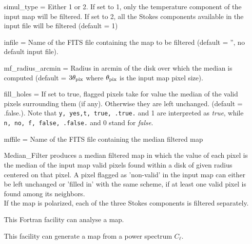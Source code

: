 \begin{qualifiers}
  \begin{qulistwide}{} %
%
    \item[{simul\_type = }]%
 Either 1 or 2. If set to 1, only the temperature component of the
      input map will be filtered. If set to 2, all the Stokes components available
      in the input file will be filtered (default = 1)
%
    \item[{infile = }]%
 Name of the FITS file containing the map to be filtered
      (default = '', no default input file).
%
    \item[{mf\_radius\_arcmin = }]%
 Radius in arcmin of the disk over which the
      median is computed (default = $3\theta_{\rm pix}$ where $\theta_{\rm pix}$
      is the input map pixel size).
%
    \item[{fill\_holes = }]%
 If set to true, flagged pixels take for value the median of
      the valid pixels surrounding them (if any). Otherwise they are left
      unchanged.
      (default = .false.). Note that {\tt y, yes,t, true, .true.} and 1 are
      interpreted as {\em true}, while {\tt n, no, f, false, .false.} and 0 stand
      for {\em false}.
%
    \item[{mffile = }]%
 Name of the FITS file containing the median filtered map
%
  \end{qulistwide}
\end{qualifiers}

\begin{codedescription}
{%
Median\_Filter produces a median filtered map in which the value of each pixel
is the median of the input map valid pixels found within a disk of given
  radius centered on that pixel. A pixel flagged as 'non-valid' in the input map
  can either be left unchanged or 'filled in' with the same scheme, if at
  least one valid pixel is found among its neighbors. \\
If the map is polarized, each of the three Stokes components is filtered separately.
}
\end{codedescription}

\begin{support}
  \begin{sulist}{} %
  \item[\htmlref{anafast}{fac:anafast}] This \healpix Fortran facility can
     	       analyse a \healpix map.
  \item[\htmlref{synfast}{fac:synfast}] This \healpix facility can generate a
  \healpix map from a power spectrum $C_\ell$.
		
  \end{sulist}
\end{support}

